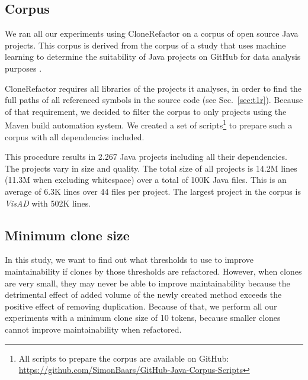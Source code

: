 \documentclass[sigconf,review]{acmart}
\begin{document}
\subsection{Corpus}
We ran all our experiments using CloneRefactor on a corpus of open source Java projects. This corpus is derived from the corpus of a study that uses machine learning to determine the suitability of Java projects on GitHub for data analysis purposes \cite{githubCorpus2013}.

CloneRefactor requires all libraries of the projects it analyses, in order to find the full paths of all referenced symbols in the source code (see Sec.~\ref{sec:t1r}). Because of that requirement, we decided to filter the corpus to only projects using the Maven build automation system. We created a set of scripts\footnote{All scripts to prepare the corpus are available on GitHub: \url{https://github.com/SimonBaars/GitHub-Java-Corpus-Scripts}} to prepare such a corpus with all dependencies included.

This procedure results in 2.267 Java projects including all their dependencies. The projects vary in size and quality. The total size of all projects is 14.2M lines (11.3M when excluding whitespace) over a total of 100K Java files. This is an average of 6.3K lines over 44 files per project. The largest project in the corpus is \textit{VisAD} with 502K lines.

\subsection{Minimum clone size}
In this study, we want to find out what thresholds to use to improve maintainability if clones by those thresholds are refactored. However, when clones are very small, they may never be able to improve maintainability because the detrimental effect of added volume of the newly created method exceeds the positive effect of removing duplication. Because of that, we perform all our experiments with a minimum clone size of 10 tokens, because smaller clones cannot improve maintainability when refactored.
\end{document}
